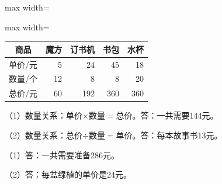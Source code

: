 
\begingroup\color{answerred}\par\smallskip\noindent\begin{adjustbox}{max width=\linewidth}\begin{adjustbox}{max width=\linewidth}\begin{tabular}{c|rrrr}
\hline
商品&魔方&订书机&书包&水杯\\\hline
单价/元&5&24&45&18\\
数量/个&12&8&8&20\\
总价/元&60&192&360&360\\\hline
\end{tabular}\end{adjustbox}\end{adjustbox}\par\smallskip\par\endgroup
{}
\begingroup\color{answerred}\noindent（1）数量关系：单价$\times$数量$=$总价。答：一共需要144元。\par
\noindent（2）数量关系：总价$\div$数量$=$单价。答：每本故事书13元。\par\par\endgroup
{}
\begingroup\color{answerred}\noindent（1）答：一共需要准备286元。\par
\noindent（2）答：每盆绿植的单价是24元。\par\par\endgroup
